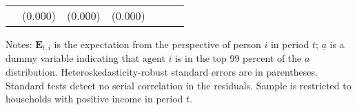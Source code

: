 \begin{table}[t]
\begin{center}
{\begin{tabular}{c|d{4}d{4}d{5}|ccc}
\\ & (0.000) &  (0.000)  &    (0.000)    &  & &    
\end{tabular}  
} 
\usebox{\crosssecond} 
\settowidth{\TableWidth}{\usebox{\crosssecond}} %
\medskip\medskip \parbox{\TableWidth}{\small Notes: $\mathbf{E}_{t,i}$ is the expectation from the perspective of person $i$ in period $t$; $\underline{a}$ is a dummy variable indicating that agent $i$ is in the top 99 percent of the $a$ distribution.  Heteroskedasticity-robust standard errors are in parentheses. Standard tests detect no serial correlation in the residuals.  Sample is restricted to households with positive income in period $t$.}  
\end{center} 
\end{table} 
